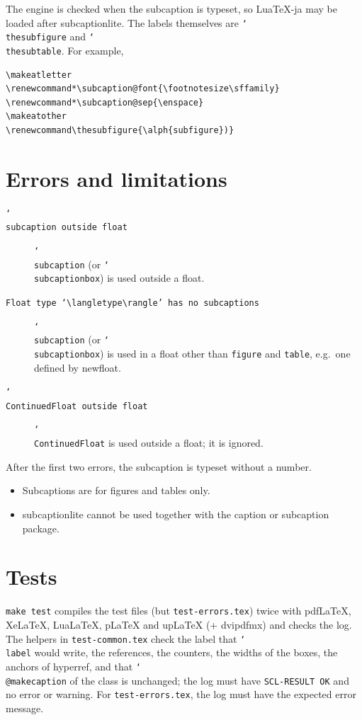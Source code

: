 \documentclass{article}
\newcommand*\cs[1]{\texttt{\char`\\#1}}
\newcommand*\pkg[1]{\textsf{#1}}
\newcommand*\env[1]{\texttt{#1}}
\newcommand*\meta[1]{\textnormal{$\langle$\textit{#1}$\rangle$}}
\begin{document}
\noindent
The engine is checked when the subcaption is typeset, so Lua\TeX-ja may
be loaded after \pkg{subcaptionlite}.  The labels themselves are
\cs{thesubfigure} and \cs{thesubtable}.  For example,
\begin{verbatim}
\makeatletter
\renewcommand*\subcaption@font{\footnotesize\sffamily}
\renewcommand*\subcaption@sep{\enspace}
\makeatother
\renewcommand\thesubfigure{\alph{subfigure})}
\end{verbatim}

\section{Errors and limitations}

\begin{description}
\item[\texttt{\char`\\subcaption outside float}] \cs{subcaption} (or
  \cs{subcaptionbox}) is used outside a float.
\item[\texttt{Float type `\meta{type}' has no subcaptions}] \cs{subcaption}
  (or \cs{subcaptionbox}) is used in a float other than \env{figure}
  and \env{table}, e.g.\ one defined by \pkg{newfloat}.
\item[\texttt{\char`\\ContinuedFloat outside float}] \cs{ContinuedFloat}
  is used outside a float; it is ignored.
\end{description}
\noindent
After the first two errors, the subcaption is typeset without a number.

\begin{itemize}
\item Subcaptions are for figures and tables only.
\item \pkg{subcaptionlite} cannot be used together with the
  \pkg{caption} or \pkg{subcaption} package.
\end{itemize}

\section{Tests}

\verb|make test| compiles the test files (but \texttt{test-errors.tex})
twice with pdf\LaTeX,
Xe\LaTeX, Lua\LaTeX, p\LaTeX{} and up\LaTeX{} (+ dvipdfmx) and checks
the log.  The helpers in \texttt{test-common.tex} check the label that
\cs{label} would write, the references, the counters, the widths of
the boxes, the anchors of \pkg{hyperref}, and that \cs{@makecaption} of
the class is unchanged; the log must have \texttt{SCL-RESULT OK} and no
error or warning.  For \texttt{test-errors.tex}, the log must have the
expected error message.
\end{document}
